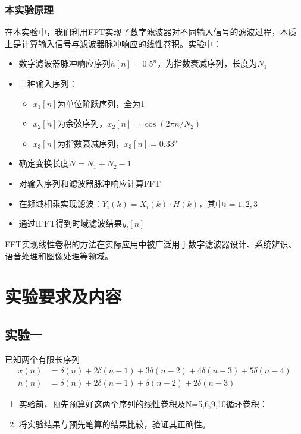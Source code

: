 \documentclass[12pt,hyperref,a4paper,UTF8]{ctexart}
\begin{document}
\subsubsection{本实验原理}
在本实验中，我们利用FFT实现了数字滤波器对不同输入信号的滤波过程，本质上是计算输入信号与滤波器脉冲响应的线性卷积。实验中：

\begin{itemize}
    \item 数字滤波器脉冲响应序列$h[n] = 0.5^n$，为指数衰减序列，长度为$N_1$
    \item 三种输入序列：
    \begin{itemize}
        \item $x_1[n]$为单位阶跃序列，全为1
        \item $x_2[n]$为余弦序列，$x_2[n] = \cos(2\pi n/N_2)$
        \item $x_3[n]$为指数衰减序列，$x_3[n] = 0.33^n$
    \end{itemize}
    \item 确定变换长度$N = N_1 + N_2 - 1$
    \item 对输入序列和滤波器脉冲响应计算FFT
    \item 在频域相乘实现滤波：$Y_i(k) = X_i(k) \cdot H(k)$，其中$i = 1,2,3$
    \item 通过IFFT得到时域滤波结果$y_i[n]$
\end{itemize}


FFT实现线性卷积的方法在实际应用中被广泛用于数字滤波器设计、系统辨识、语音处理和图像处理等领域。



\section{实验要求及内容}

\subsection{实验一}


已知两个有限长序列
\begin{align*}
x(n) &= \delta(n) + 2\delta(n-1) + 3\delta(n-2) + 4\delta(n-3) + 5\delta(n-4) \\
h(n) &= \delta(n) + 2\delta(n-1) + \delta(n-2) + 2\delta(n-3)
\end{align*}
\begin{enumerate}
    \item 实验前，预先预算好这两个序列的线性卷积及N=5,6,9,10循环卷积：
    \item 将实验结果与预先笔算的结果比较，验证其正确性。
\end{enumerate}
\end{document}

